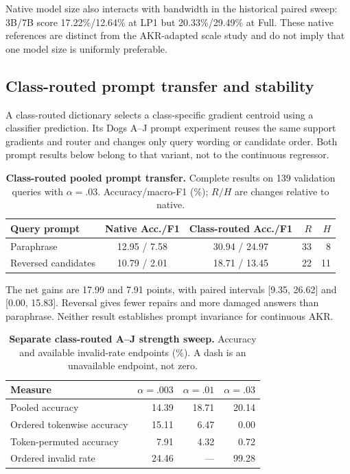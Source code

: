 \documentclass{article}
\begin{document}
Native model size also interacts with bandwidth in the historical paired sweep: 3B/7B score 17.22\%/12.64\% at LP1 but 20.33\%/29.49\% at Full. These native references are distinct from the AKR-adapted scale study and do not imply that one model size is uniformly preferable.

\subsection{Class-routed prompt transfer and stability}
\label{app:prompt}
A class-routed dictionary selects a class-specific gradient centroid using a classifier prediction. Its Dogs A--J prompt experiment reuses the same support gradients and router and changes only query wording or candidate order. Both prompt results below belong to that variant, not to the continuous regressor.

\begin{table}[htbp]
\caption{\textbf{Class-routed pooled prompt transfer.} Complete results on 139 validation queries with $\alpha=.03$. Accuracy/macro-F1 (\%); $R/H$ are changes relative to native.}
\label{tab:prompt}
\centering\small
\begin{tabular}{@{}lccrr@{}}
\toprule
Query prompt & Native Acc./F1 & Class-routed Acc./F1 & $R$ & $H$ \\
\midrule
Paraphrase & 12.95 / 7.58 & 30.94 / 24.97 & 33 & 8 \\
Reversed candidates & 10.79 / 2.01 & 18.71 / 13.45 & 22 & 11 \\
\bottomrule
\end{tabular}
\end{table}

The net gains are 17.99 and 7.91 points, with paired intervals [9.35, 26.62] and [0.00, 15.83]. Reversal gives fewer repairs and more damaged answers than paraphrase. Neither result establishes prompt invariance for continuous AKR.

\begin{table}[htbp]
\caption{\textbf{Separate class-routed A--J strength sweep.} Accuracy and available invalid-rate endpoints (\%). A dash is an unavailable endpoint, not zero.}
\label{tab:variant_stability}
\centering\small
\begin{tabular}{@{}lrrr@{}}
\toprule
Measure & $\alpha=.003$ & $\alpha=.01$ & $\alpha=.03$ \\
\midrule
Pooled accuracy & 14.39 & 18.71 & 20.14 \\
Ordered tokenwise accuracy & 15.11 & 6.47 & 0.00 \\
Token-permuted accuracy & 7.91 & 4.32 & 0.72 \\
Ordered invalid rate & 24.46 & --- & 99.28 \\
\bottomrule
\end{tabular}
\end{table}
\end{document}
